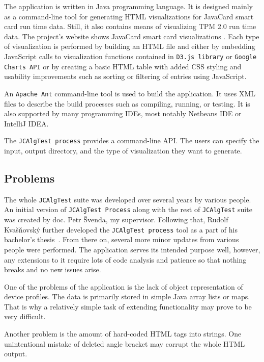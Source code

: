 The application is written in Java programming language. It is designed mainly as a command-line tool for generating HTML visualizations for JavaCard smart card run time data. Still, it also contains means of visualizing TPM 2.0 run time data. The project's website shows JavaCard smart card visualizations \cite{jcalgtestWeb}. Each type of visualization is performed by building an HTML file and either by embedding JavaScript calls to visualization functions contained in  \texttt{D3.js library} or \texttt{Google Charts API} or by creating a basic HTML table with added CSS styling and usability improvements such as sorting or filtering of entries using JavaScript. 

An \texttt{Apache Ant} command-line tool is used to build the application. It uses XML files to describe the build processes such as compiling, running, or testing. It is also supported by many programming IDEs, most notably Netbeans IDE or IntelliJ IDEA.

The \texttt{JCAlgTest process} provides a command-line API. The users can specify the input, output directory, and the type of visualization they want to generate.

\subsection{Problems}\label{subsec:design-problems}
The whole \texttt{JCAlgTest} suite was developed over several years by various people. An initial version of \texttt{JCAlgTest Process} along with the rest of \texttt{JCAlgTest} suite was created by doc. Petr Švenda, my supervisor. Following that, Rudolf Kvašňovský further developed the \texttt{JCAlgTest process} tool as a part of his bachelor's thesis~\cite{Kvasnovsky2016thesis}. From there on, several more minor updates from various people were performed. The application serves its intended purpose well, however, any extensions to it require lots of code analysis and patience so that nothing breaks and no new issues arise.

One of the problems of the application is the lack of object representation of device profiles. The data is primarily stored in simple Java array lists or maps. That is why a relatively simple task of extending functionality may prove to be very difficult. 

Another problem is the amount of hard-coded HTML tags into strings. One unintentional mistake of deleted angle bracket may corrupt the whole HTML output. %

